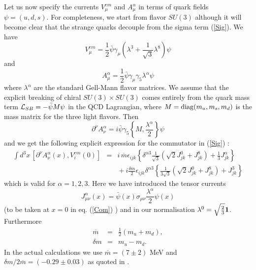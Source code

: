 Let us now specify the currents $V_{\mu}^{em}$ and $A_{\mu}^{\alpha}$
in terms of quark fields $\psi=(u,d,s)$. For completeness, we start
from flavor $SU(3)$ although it will become clear that the strange quarks
decouple from the sigma term (\ref{Sig}). We have
\begin{equation}
\label{vector}
 V_{\mu}^{em}= \frac{1}{2} \bar{\psi}\gamma_{\mu}(\lambda^3+\frac{1}
 {\sqrt{3}}\lambda^8)\psi
\end{equation}
and
\begin{equation}
\label{axial}
A_{\mu}^{\alpha}=\frac{1}{2}\bar{\psi}\gamma_{\mu}\gamma_5\lambda^{\alpha}
\psi
\end{equation}
where $\lambda^{\alpha}$ are the standard Gell-Mann flavor matrices.
We assume that the explicit breaking of chiral $SU(3)\times SU(3)$
comes entirely from the quark mass term ${\cal L}_{SB} = -\bar{\psi}
M\psi$ in the QCD  Lagrangian, where $M={\rm diag}(m_u,m_s,m_d)$ is the
mass matrix for the three light flavors. Then
\begin{equation}
\label{Div}
\partial^{\nu} A_{\nu}^{\alpha} = i\bar{\psi}\gamma_5 \left\{M,
 \frac{\lambda^{\alpha}}{2}\right\}\psi
\end{equation}
and we get the following explicit expression for the  commutator
in (\ref{Sig}) :
\begin{eqnarray}
\label{Com}
\int d^3 x\, [\partial^{\nu}A_{\nu}^{\alpha}(x),V_{i}^{em}(0)]& =&
i\,\overline{m} \epsilon_{ijk} \left\{  \delta^{\alpha 3}
\frac{1}{\sqrt{3}}\left( \sqrt{2} J_{jk}^{0}+J_{jk}^{8} \right) +
 \frac{1}{3} J_{jk}^{\alpha}\right\}   \nonumber \\
& &\mbox{} + i\frac{\delta m}{2}\epsilon_{ijk}\delta^{\alpha 3} \left\{
 \frac{1}{3\sqrt{3}}\left(\sqrt{2} J_{jk}^{0}+ J_{jk}^{8} \right)
  + J_{jk}^{3}  \right\}  
\end{eqnarray}
which is valid for $\alpha=1,2,3$.
Here we have introduced the tensor currents
\begin{equation}
\label{Ten}
 J_{\mu\nu}^{\alpha}(x) = \bar{\psi}(x) \sigma_{\mu\nu}
 \frac{\lambda^{\alpha}}{2}\psi (x) 
\end{equation}
(to be taken at $x=0$ in eq. (\ref{Com}) ) and in our normalisation
$\lambda^0 =\sqrt{\frac{2}{3}}{\bf  1}$. Furthermore
\alpheqn
\begin{eqnarray}
\overline{m} &=& \frac{1}{2} (m_u + m_d) ,  \\
\delta m     &=& m_u - m_d .
\end{eqnarray}
\reseteqn
In the actual calculations we use $\overline{m}=(7\pm 2)$ MeV and
$\delta m/2\overline{m} =(-0.29\pm 0.03)$ as quoted in \cite{GaL}.

